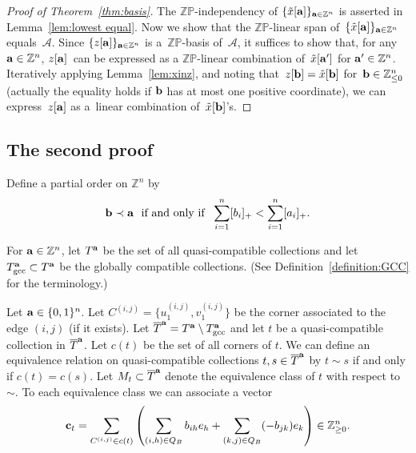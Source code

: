 \documentclass[pdftex]{sigma}
\numberwithin{equation}{section}
\begin{document}
\begin{proof}[Proof of Theorem~\ref{thm:basis}]
The $\mathbb{ZP}$-independency of $\{\tilde{x}[{\bf a}]\}_{{\bf a}\in\mathbb{Z}^n}$ is asserted in Lemma~\ref{lem:lowest equal}.
Now we show that the $\mathbb{ZP}$-linear span of~$\{\tilde{x}[{\bf a}]\}_{{\bf a}\in\mathbb{Z}^n}$ equals~$\mathcal{A}$. Since $\{z[{\bf a}]\}_{{\bf a}\in\mathbb{Z}^n}$ is a~$\mathbb{ZP}$-basis of~$\mathcal{A}$, it suf\/f\/ices to show that, for any~${\bf a}\in\mathbb{Z}^n$, $z[{\bf a}]$~can be expressed as a $\mathbb{ZP}$-linear combination of~$\tilde{x}[{\bf a}']$ for ${\bf a'}\in\mathbb{Z}^n$.  Iteratively applying Lemma~\ref{lem:xinz}, and noting that~$z[{\bf b}]=\tilde{x}[{\bf b}]$ for~${\bf b}\in\mathbb{Z}^n_{\le0}$ (actually the equality holds if ${\bf b}$ has at most one positive coordinate),  we can express~$z[{\bf a}]$ as a~linear combination of~$\tilde{x}[{\bf b}]$'s.
\end{proof}

\subsection{The second proof}\label{section6.2}

Def\/ine a partial order on $\mathbb{Z}^n  $ by
\begin{gather}\label{eq:prec2}
{\bf b} \prec {\bf a} \ \ \text{if and only if}\ \ \sum_{i=1}^n [b_i]_+ < \sum_{i=1}^n [a_i]_+.
\end{gather}

\begin{Definition}
For ${\bf a}\in\mathbb{Z}^n$, let $T^{\bf a}$ be the set of all quasi-compatible collections and let $T^{\bf a}_{\rm gcc} \subset T^{\bf a}$ be the globally compatible collections. (See Def\/inition~\ref{definition:GCC} for the terminology.)
\end{Definition}

Let $ {\bf a} \in \{0,1\}^n  $. Let $C^{(i,j)} = \{ u_1^{(i,j)} , v_1^{(i,j)} \}$ be the corner associated to the edge $(i,j)$ (if it exists). Let $\overline{T}^{\bf a}=T^{\bf a}\setminus T^{\bf a}_{\rm gcc}$ and let $t$ be a quasi-compatible collection in $\overline{T}^{\bf a}$. Let $c(t)$ be the set of all corners of $t$.
 We can def\/ine an equivalence relation on quasi-compatible collections $t,s \in \overline{T}^{\bf a}$ by $t \sim s$ if and only if $c(t)=c(s)$. Let $M_t \subset \overline{T}^{\bf a}$ denote the equivalence class of $t$ with respect to $\sim.$
 To each equivalence class we can associate a vector
 \begin{gather*}
 {\bf c}_t = \sum_{C^{(i,j)} \in c(t)}\left(\sum_{(i,h)\in Q_B} b_{ih} e_h + \sum_{(k,j)\in Q_B} (-b_{jk}) e_k\right) \in \mathbb{Z}_{\geq 0}^n.
 \end{gather*}
\end{document}
